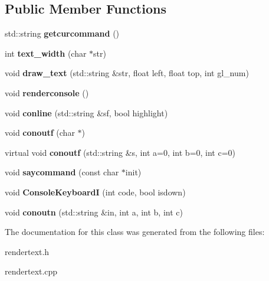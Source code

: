\subsection*{Public Member Functions}
\begin{DoxyCompactItemize}
\item 
std\+::string {\bfseries getcurcommand} ()\hypertarget{classRText_ae0b79b7fb8b97f78624e61ce63c301aa}{}\label{classRText_ae0b79b7fb8b97f78624e61ce63c301aa}

\item 
int {\bfseries text\+\_\+width} (char $\ast$str)\hypertarget{classRText_a64e9ec13d7cc27ca1c34aa0202c50520}{}\label{classRText_a64e9ec13d7cc27ca1c34aa0202c50520}

\item 
void {\bfseries draw\+\_\+text} (std\+::string \&str, float left, float top, int gl\+\_\+num)\hypertarget{classRText_ade6a93abfd31d7268a726f929e3c0d07}{}\label{classRText_ade6a93abfd31d7268a726f929e3c0d07}

\item 
void {\bfseries renderconsole} ()\hypertarget{classRText_aba404518ab70bfa30753b10c47f3ccb7}{}\label{classRText_aba404518ab70bfa30753b10c47f3ccb7}

\item 
void {\bfseries conline} (std\+::string \&sf, bool highlight)\hypertarget{classRText_afb5bd421f12ff92fbd90cb3cd53abf22}{}\label{classRText_afb5bd421f12ff92fbd90cb3cd53abf22}

\item 
void {\bfseries conoutf} (char $\ast$)\hypertarget{classRText_ac4640631884677022f6fc3c767d2f8a8}{}\label{classRText_ac4640631884677022f6fc3c767d2f8a8}

\item 
virtual void {\bfseries conoutf} (std\+::string \&s, int a=0, int b=0, int c=0)\hypertarget{classRText_a288d530b5fd46d8bbd367c03ef4d4671}{}\label{classRText_a288d530b5fd46d8bbd367c03ef4d4671}

\item 
void {\bfseries saycommand} (const char $\ast$init)\hypertarget{classRText_a2133166ff5e7d9a8bc382121197d1c30}{}\label{classRText_a2133166ff5e7d9a8bc382121197d1c30}

\item 
void {\bfseries Console\+KeyboardI} (int code, bool isdown)\hypertarget{classRText_a41190febaf3191b130db77bb88760c81}{}\label{classRText_a41190febaf3191b130db77bb88760c81}

\item 
void {\bfseries conoutn} (std\+::string \&in, int a, int b, int c)\hypertarget{classRText_acf25a6aae5dced4a3f7d69b67c6f73e1}{}\label{classRText_acf25a6aae5dced4a3f7d69b67c6f73e1}

\end{DoxyCompactItemize}


The documentation for this class was generated from the following files\+:\begin{DoxyCompactItemize}
\item 
rendertext.\+h\item 
rendertext.\+cpp\end{DoxyCompactItemize}
